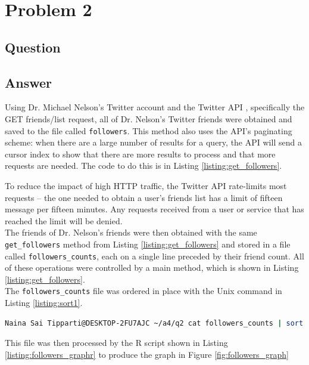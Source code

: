 \section{Problem 2}

\subsection{Question}
\vspace*{10pt}


\subsection{Answer}
Using Dr. Michael Nelson's Twitter account and the Twitter API \cite{api}, specifically the GET friends/list \cite{followinglist} request, all of Dr. Nelson's Twitter friends were obtained and saved to the file called {\tt followers}. This method also uses the API's paginating scheme: when there are a large number of results for a query, the API will send a cursor index to show that there are more results to process and that more requests are needed. The code to do this is in Listing \ref{listing:get_followers}. 



\clearpage
To reduce the impact of high HTTP traffic, the Twitter API\cite{api} rate-limits most requests -- the one needed to obtain a user's friends list\cite{followerslist} has a limit of fifteen message per fifteen minutes. Any requests received from a user or service that has reached the limit will be denied.
\\
The friends of Dr. Nelson's friends were then obtained with the same {\tt get\_followers} method from Listing \ref{listing:get_followers} and stored in a file called {\tt followers\_counts}, each on a single line preceded by their friend count. All of these operations were controlled by a main method, which is shown in Listing \ref{listing:get_followers}.
\\
The {\tt followers\_counts} file was ordered in place with the Unix command in Listing \ref{listing:sort1}. 
\vspace{2mm}
\begin{lstlisting}[language=Bash,caption={Sort command},label=listing:sort1]
Naina Sai Tipparti@DESKTOP-2FU7AJC ~/a4/q2 cat followers_counts | sort -g -o followers_counts
\end{lstlisting}
\vspace{2mm}
This file was then processed by the R script shown in Listing \ref{listing:followers_graphr} to produce the graph in Figure \ref{fig:followers_graph}

